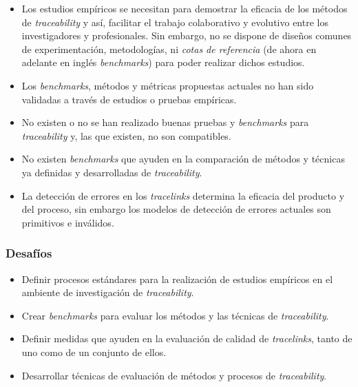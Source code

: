 \documentclass[a4paper,12pt,twoside,spanish,openright]{book}
\begin{document}
\begin{itemize}[label={$\times$}]

\item Los estudios empíricos se necesitan para demostrar la eficacia de los métodos de \textit{traceability} y así, facilitar el trabajo colaborativo y evolutivo entre los investigadores y profesionales. Sin embargo, no se dispone de diseños comunes de experimentación, metodologías, ni \textit{cotas de referencia} (de ahora en adelante en inglés \textit{benchmarks}) para poder realizar dichos estudios.

\item Los \textit{benchmarks}, métodos y métricas propuestas actuales no han sido validadas a través de estudios o pruebas empíricas.

\item No existen o no se han realizado buenas pruebas y \textit{benchmarks} para \textit{traceability} y, las que existen, no son compatibles. 

\item No existen \textit{benchmarks} que ayuden en la comparación de métodos y técnicas ya definidas y desarrolladas de \textit{traceability}.

\item La detección de errores en los \textit{tracelinks} determina la eficacia del producto y del proceso, sin embargo los modelos de detección de errores actuales son primitivos e inválidos.

\end{itemize}

\subsubsection{Desafíos}

\begin{itemize}[label={\checkmark}]

\item Definir procesos estándares para la realización de estudios empíricos en el ambiente de investigación de \textit{traceability}.

\item Crear \textit{benchmarks} para evaluar los métodos y las técnicas de \textit{traceability}.

\item Definir medidas que ayuden en la evaluación de calidad de \textit{tracelinks}, tanto de uno como de un conjunto de ellos.

\item Desarrollar técnicas de evaluación de métodos y procesos de \textit{traceability}.

\end{itemize}
\end{document}
